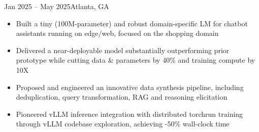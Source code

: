     {}
    {Jan 2025 -- May 2025}{Atlanta, GA}{}
\begin{itemize}
    \item Built a tiny (100M-parameter) and robust domain-specific LM for chatbot assistants running on edge/web, 
    focused on the shopping domain

    \item Delivered a near-deployable model substantially
    outperforming prior prototype
    while cutting data \& parameters by 40\% and training compute by 10X

    \item Proposed and engineered an innovative data synthesis pipeline,
    including deduplication, query transformation, RAG and reasoning elicitation


    \item Pioneered vLLM inference integration with distributed torchrun training
    through vLLM codebase exploration,
    achieving -50\% wall-clock time



\end{itemize}
